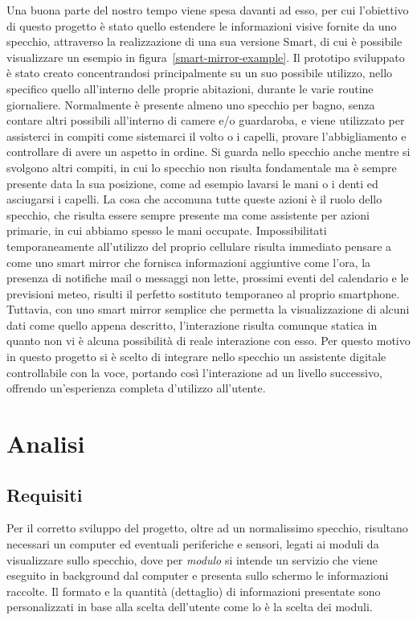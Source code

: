 \documentclass[12pt,a4paper]{article}
\begin{document}
Una buona parte del nostro tempo viene spesa davanti ad esso, per cui l'obiettivo
di questo progetto \`e stato quello estendere le informazioni visive fornite da uno
specchio, attraverso la realizzazione di una sua versione Smart, di cui \`e possibile
visualizzare un esempio in figura~\ref{smart-mirror-example}. Il prototipo sviluppato
\`e stato creato concentrandosi principalmente su un suo possibile utilizzo, nello
specifico quello all'interno delle proprie abitazioni, durante le varie routine
giornaliere. Normalmente \`e presente almeno uno specchio per bagno, senza contare
altri possibili all'interno di camere e/o guardaroba, e viene utilizzato per assisterci in compiti
come sistemarci il volto o i capelli, provare l'abbigliamento e controllare di avere un
aspetto in ordine. Si guarda nello specchio anche mentre si svolgono altri compiti, in cui
lo specchio non risulta fondamentale ma \`e sempre presente data la sua posizione, come
ad esempio lavarsi le mani o i denti ed asciugarsi i capelli. La cosa che accomuna tutte
queste azioni \`e il ruolo dello specchio, che risulta essere sempre presente ma come 
assistente per azioni primarie, in cui abbiamo spesso le mani occupate. Impossibilitati temporaneamente
all'utilizzo del proprio cellulare risulta immediato pensare a come uno smart mirror che
fornisca informazioni aggiuntive come l'ora, la presenza di notifiche mail o messaggi non lette,
prossimi eventi del calendario e le previsioni meteo, risulti il perfetto sostituto temporaneo al
proprio smartphone. Tuttavia, con uno smart mirror semplice che permetta la visualizzazione di alcuni dati
come quello appena descritto, l'interazione risulta comunque statica in quanto non vi \`e alcuna
possibilit\`a di reale interazione con esso. Per questo motivo in questo progetto si \`e scelto
di integrare nello specchio un assistente digitale controllabile con la voce, portando cos\`i l'interazione
ad un livello successivo, offrendo un'esperienza completa d'utilizzo all'utente.

\newpage
\section{Analisi}

\subsection{Requisiti}\label{requisiti}

Per il corretto sviluppo del progetto, oltre ad un normalissimo specchio, risultano necessari un computer
ed eventuali periferiche e sensori, legati ai moduli da visualizzare sullo specchio, dove per \textit{modulo}
si intende un servizio che viene eseguito in background dal computer e presenta sullo schermo le informazioni
raccolte. Il formato e la quantit\`a (dettaglio) di informazioni presentate sono personalizzati in base alla
scelta dell'utente come lo \`e la scelta dei moduli.
\end{document}
